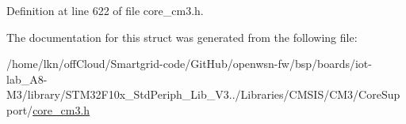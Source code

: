 Definition at line 622 of file core\+\_\+cm3.\+h.



The documentation for this struct was generated from the following file\+:\begin{DoxyCompactItemize}
\item 
/home/lkn/off\+Cloud/\+Smartgrid-\/code/\+Git\+Hub/openwsn-\/fw/bsp/boards/iot-\/lab\+\_\+\+A8-\/\+M3/library/\+S\+T\+M32\+F10x\+\_\+\+Std\+Periph\+\_\+\+Lib\+\_\+\+V3../\+Libraries/\+C\+M\+S\+I\+S/\+C\+M3/\+Core\+Support/\hyperlink{iot-lab___a8-_m3_2library_2_s_t_m32_f10x___std_periph___lib___v3_85_80_2_libraries_2_c_m_s_i_s_241d01c0ea18c1090ebeb06e5ef0ea5eb}{core\+\_\+cm3.\+h}\end{DoxyCompactItemize}
